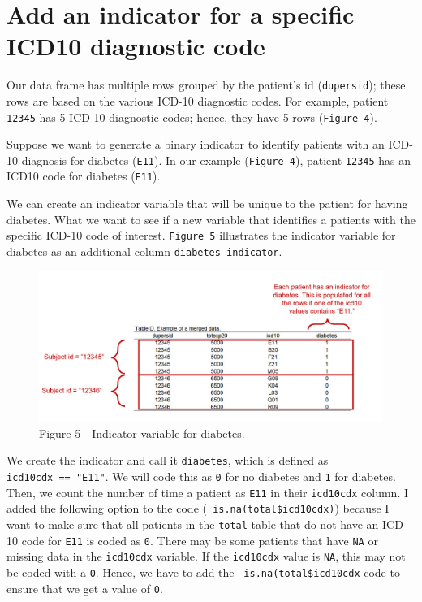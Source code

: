 \documentclass[
]{book}
\begin{document}
\hypertarget{add-an-indicator-for-a-specific-icd10-diagnostic-code}{%
\section{Add an indicator for a specific ICD10 diagnostic code}\label{add-an-indicator-for-a-specific-icd10-diagnostic-code}}

Our data frame has multiple rows grouped by the patient's id (\texttt{dupersid}); these rows are based on the various ICD-10 diagnostic codes. For example, patient \texttt{12345} has 5 ICD-10 diagnostic codes; hence, they have 5 rows (\texttt{Figure\ 4}).

Suppose we want to generate a binary indicator to identify patients with an ICD-10 diagnosis for diabetes (\texttt{E11}). In our example (\texttt{Figure\ 4}), patient \texttt{12345} has an ICD10 code for diabetes (\texttt{E11}).

We can create an indicator variable that will be unique to the patient for having diabetes. What we want to see if a new variable that identifies a patients with the specific ICD-10 code of interest. \texttt{Figure\ 5} illustrates the indicator variable for diabetes as an additional column \texttt{diabetes\_indicator}.

\begin{figure}
\includegraphics[width=1\linewidth]{Figure 2_5} \caption{Figure 5 - Indicator variable for diabetes.}\label{fig:unnamed-chunk-17}
\end{figure}

We create the indicator and call it \texttt{diabetes}, which is defined as \texttt{icd10cdx\ ==\ "E11"}. We will code this as \texttt{0} for no diabetes and \texttt{1} for diabetes. Then, we count the number of time a patient as \texttt{E11} in their \texttt{icd10cdx} column. I added the following option to the code (\texttt{\textbar{}\ is.na(total\$icd10cdx)}) because I want to make sure that all patients in the \texttt{total} table that do not have an ICD-10 code for \texttt{E11} is coded as \texttt{0}. There may be some patients that have \texttt{NA} or missing data in the \texttt{icd10cdx} variable. If the \texttt{icd10cdx} value is \texttt{NA}, this may not be coded with a \texttt{0}. Hence, we have to add the \texttt{\textbar{}\ is.na(total\$icd10cdx} code to ensure that we get a value of \texttt{0}.
\end{document}
